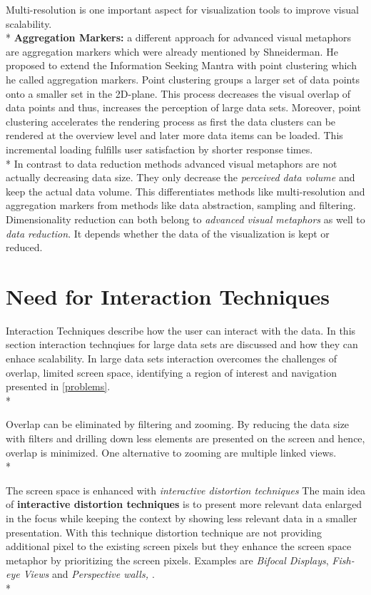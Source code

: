 Multi-resolution is one important aspect for visualization tools to improve visual scalability.\\*
\textbf{Aggregation Markers:} a different approach for advanced visual metaphors are aggregation markers which were already mentioned by Shneiderman\cite{Shneiderman2008}. He proposed to extend the Information Seeking Mantra\cite{Shneiderman1996} with point clustering which he called aggregation markers. Point clustering groups a larger set of data points onto a smaller set in the 2D-plane\cite{Morrison2014}. This process decreases the visual overlap of data points and thus, increases the perception of large data sets. Moreover, point clustering accelerates the rendering process as first the data clusters  can be rendered at the overview level and later more data items can be loaded. This incremental loading fulfills user satisfaction by shorter response times.\\*
In contrast to data reduction methods advanced visual metaphors are not actually decreasing data size. They only decrease the \textit{perceived data volume} and keep the actual data volume. This differentiates methods like multi-resolution and aggregation markers from methods like data abstraction, sampling and filtering. Dimensionality reduction can both belong to \textit{advanced visual metaphors} as well to \textit{data reduction}. It depends whether the data of the visualization is kept or reduced. 


\section{Need for Interaction Techniques}
Interaction Techniques describe how the user can interact with the data. In this section interaction technqiues for large data sets are discussed and how they can enhace scalability. In large data sets interaction overcomes the challenges of overlap, limited screen space, identifying a region of interest and navigation presented in \ref{problems}. \\*

Overlap can be eliminated by filtering and zooming. By reducing the data size with filters and drilling down less elements are presented on the screen and hence, overlap is minimized. One alternative to zooming are multiple linked views.\\*

The screen space is enhanced with \textit{interactive distortion techniques}\cite{mackinlay1991perspective}
The main idea of \textbf{interactive distortion techniques} is to present more relevant data enlarged in the focus while keeping the context by showing less relevant data in a smaller presentation. With this technique distortion technique are not  providing additional pixel to the existing screen pixels but they enhance the screen space metaphor by prioritizing the screen pixels.
Examples are \textit{Bifocal Displays}\cite{Spence1982}, \textit{Fish-eye Views} and \textit{Perspective walls\cite{Keim2005}, \cite{mackinlay1991perspective}}.\\*

